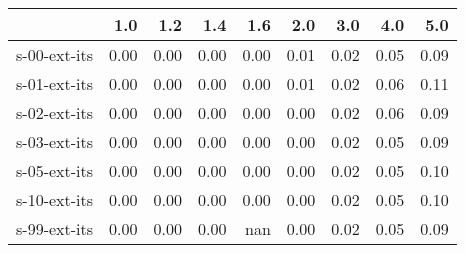 \begin{tabular}{lrrrrrrrr}
\toprule
{} &  1.0 &  1.2 &  1.4 &  1.6 &  2.0 &  3.0 &  4.0 &  5.0 \\
\midrule
s-00-ext-its & 0.00 & 0.00 & 0.00 & 0.00 & 0.01 & 0.02 & 0.05 & 0.09 \\
s-01-ext-its & 0.00 & 0.00 & 0.00 & 0.00 & 0.01 & 0.02 & 0.06 & 0.11 \\
s-02-ext-its & 0.00 & 0.00 & 0.00 & 0.00 & 0.00 & 0.02 & 0.06 & 0.09 \\
s-03-ext-its & 0.00 & 0.00 & 0.00 & 0.00 & 0.00 & 0.02 & 0.05 & 0.09 \\
s-05-ext-its & 0.00 & 0.00 & 0.00 & 0.00 & 0.00 & 0.02 & 0.05 & 0.10 \\
s-10-ext-its & 0.00 & 0.00 & 0.00 & 0.00 & 0.00 & 0.02 & 0.05 & 0.10 \\
s-99-ext-its & 0.00 & 0.00 & 0.00 &  nan & 0.00 & 0.02 & 0.05 & 0.09 \\
\bottomrule
\end{tabular}
